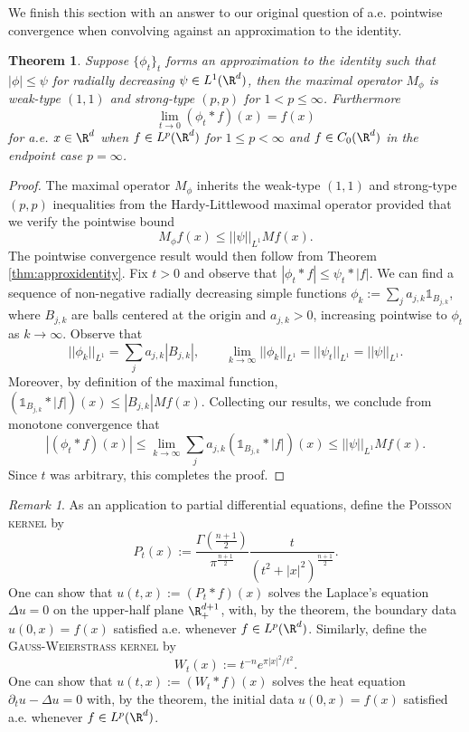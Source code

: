 \documentclass[reqno]{amsart}
\newtheorem{theorem}{Theorem}
\theoremstyle{definition}
\theoremstyle{remark}
\newtheorem*{remark}{Remark}
\renewcommand{\emph}{\textsc}
\begin{document}
We finish this section with an answer to our original question of a.e. pointwise convergence when convolving against an approximation to the identity. 

\begin{theorem}
	Suppose $\{ \phi_t \}_t$ forms an approximation to the identity such that $|\phi| \leq \psi$ for radially decreasing $\psi \in L^1 (\R^d)$, then the maximal operator $M_\phi$ is weak-type $(1, 1)$ and strong-type $(p, p)$ for $1 < p \leq \infty$. Furthermore
		\[ \lim_{t \to 0} (\phi_t * f) (x) = f(x) \]
	for a.e. $x \in \R^d$ when $f \in L^p (\R^d)$ for $1 \leq p < \infty$ and $f \in C_0 (\R^d)$ in the endpoint case $p = \infty$. 
\end{theorem}

\begin{proof}
	The maximal operator $M_\phi$ inherits the weak-type $(1, 1)$ and strong-type $(p, p)$ inequalities from the Hardy-Littlewood maximal operator provided that we verify the pointwise bound
		\[ M_\phi f (x) \leq ||\psi||_{L^1} M f(x). \]
	The pointwise convergence result would then follow from Theorem \ref{thm:approxidentity}. 	Fix $t > 0$ and observe that $|\phi_t * f| \leq \psi_t * |f|$. We can find a sequence of non-negative radially decreasing simple functions $\phi_k := \sum_j a_{j, k} \mathbb 1_{B_{j, k}}$, where $B_{j, k}$ are balls centered at the origin and $a_{j, k} > 0$, increasing pointwise to $\phi_t$ as $k \to \infty$. Observe that
		\[ ||\phi_{k} ||_{L^1} = \sum_j a_{j , k} |B_{j , k}|, \qquad \lim_{k \to \infty} ||\phi_k||_{L^1} = ||\psi_t||_{L^1} = ||\psi||_{L^1}. \]
	Moreover, by definition of the maximal function, $(\mathbb 1_{B_{j , k}} * |f|) (x)\leq |B_{j, k}| M f(x)$. Collecting our results, we conclude from monotone convergence that
		\[ |(\phi_t * f)(x)| \leq \lim_{k \to \infty} \sum_j a_{j ,k} (\mathbb 1_{B_{j, k}} * |f|)(x) \leq ||\psi||_{L^1} Mf(x).  \]
	Since $t$ was arbitrary, this completes the proof. 	
\end{proof}

\begin{remark}
	As an application to partial differential equations, define the \emph{Poisson kernel} by 
		\[ P_t (x) := \frac{\Gamma \left( \frac{n + 1}{2} \right)}{\pi^{\frac{n + 1}{2}}} \frac{t}{(t^2 + |x|^2)^{\frac{n + 1}{2}}}. \]
	One can show that $u(t, x) := (P_t * f) (x)$ solves the Laplace's equation $\Delta u = 0$ on the upper-half plane $\R^{d + 1}_+$, with, by the theorem, the boundary data $u(0, x) = f(x)$ satisfied a.e. whenever $f \in L^p (\R^d)$. Similarly, define the \emph{Gauss-Weierstrass kernel} by 
		\[ W_t (x) := t^{-n} e^{\pi |x|^2/t^2}. \]
	One can show that $u(t, x) := (W_t * f) (x)$	solves the heat equation $\partial_t u - \Delta u = 0$ with, by the theorem, the initial data $u(0, x) = f(x)$ satisfied a.e. whenever $f \in L^p (\R^d)$. 
\end{remark}
\end{document}
